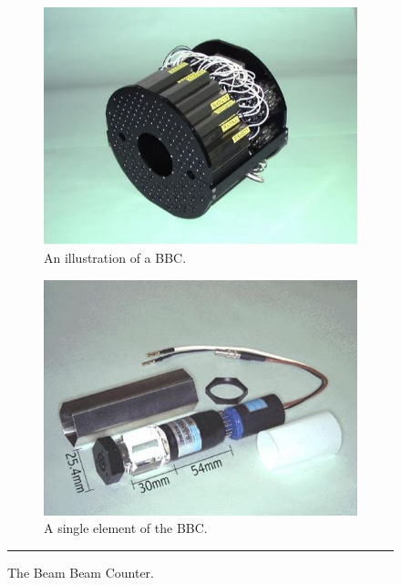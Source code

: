 \begin{figure}
\centering
\begin{subfigure}[b]{0.4\textwidth}
    \centering
    \includegraphics[width=\textwidth]{Figures/bbcrender.JPG}
    \caption{An illustration of a BBC.}
\end{subfigure}
\begin{subfigure}[b]{0.4\textwidth}
    \centering
    \includegraphics[width=\textwidth]{Figures/bbcsinglechannel.JPG} 
    \caption{A single element of the BBC.}

\end{subfigure}
 \rule{35em}{0.5pt}
\caption[The Beam Beam Counter.]{The Beam Beam Counter.}
    \label{fig:BBCillustrations}
\end{figure}


